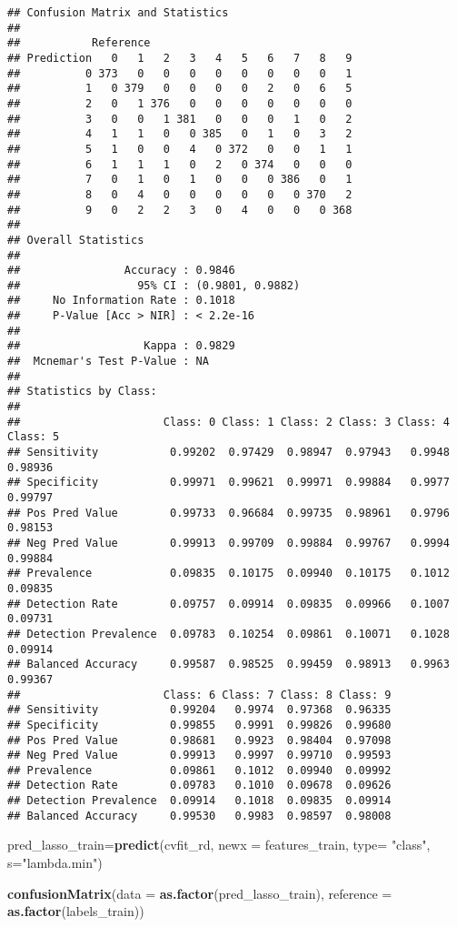 \documentclass[]{article}
\newenvironment{Shaded}{\begin{snugshade}}{\end{snugshade}}
\newcommand{\KeywordTok}[1]{\textcolor[rgb]{0.13,0.29,0.53}{\textbf{#1}}}
\newcommand{\DataTypeTok}[1]{\textcolor[rgb]{0.13,0.29,0.53}{#1}}
\newcommand{\StringTok}[1]{\textcolor[rgb]{0.31,0.60,0.02}{#1}}
\newcommand{\NormalTok}[1]{#1}
\begin{document}
\begin{verbatim}
## Confusion Matrix and Statistics
## 
##           Reference
## Prediction   0   1   2   3   4   5   6   7   8   9
##          0 373   0   0   0   0   0   0   0   0   1
##          1   0 379   0   0   0   0   2   0   6   5
##          2   0   1 376   0   0   0   0   0   0   0
##          3   0   0   1 381   0   0   0   1   0   2
##          4   1   1   0   0 385   0   1   0   3   2
##          5   1   0   0   4   0 372   0   0   1   1
##          6   1   1   1   0   2   0 374   0   0   0
##          7   0   1   0   1   0   0   0 386   0   1
##          8   0   4   0   0   0   0   0   0 370   2
##          9   0   2   2   3   0   4   0   0   0 368
## 
## Overall Statistics
##                                           
##                Accuracy : 0.9846          
##                  95% CI : (0.9801, 0.9882)
##     No Information Rate : 0.1018          
##     P-Value [Acc > NIR] : < 2.2e-16       
##                                           
##                   Kappa : 0.9829          
##  Mcnemar's Test P-Value : NA              
## 
## Statistics by Class:
## 
##                      Class: 0 Class: 1 Class: 2 Class: 3 Class: 4 Class: 5
## Sensitivity           0.99202  0.97429  0.98947  0.97943   0.9948  0.98936
## Specificity           0.99971  0.99621  0.99971  0.99884   0.9977  0.99797
## Pos Pred Value        0.99733  0.96684  0.99735  0.98961   0.9796  0.98153
## Neg Pred Value        0.99913  0.99709  0.99884  0.99767   0.9994  0.99884
## Prevalence            0.09835  0.10175  0.09940  0.10175   0.1012  0.09835
## Detection Rate        0.09757  0.09914  0.09835  0.09966   0.1007  0.09731
## Detection Prevalence  0.09783  0.10254  0.09861  0.10071   0.1028  0.09914
## Balanced Accuracy     0.99587  0.98525  0.99459  0.98913   0.9963  0.99367
##                      Class: 6 Class: 7 Class: 8 Class: 9
## Sensitivity           0.99204   0.9974  0.97368  0.96335
## Specificity           0.99855   0.9991  0.99826  0.99680
## Pos Pred Value        0.98681   0.9923  0.98404  0.97098
## Neg Pred Value        0.99913   0.9997  0.99710  0.99593
## Prevalence            0.09861   0.1012  0.09940  0.09992
## Detection Rate        0.09783   0.1010  0.09678  0.09626
## Detection Prevalence  0.09914   0.1018  0.09835  0.09914
## Balanced Accuracy     0.99530   0.9983  0.98597  0.98008
\end{verbatim}

\begin{Shaded}
\begin{Highlighting}[]
\NormalTok{pred_lasso_train=}\KeywordTok{predict}\NormalTok{(cvfit_rd, }\DataTypeTok{newx =}\NormalTok{ features_train, }\DataTypeTok{type=} \StringTok{"class"}\NormalTok{, }\DataTypeTok{s=}\StringTok{"lambda.min"}\NormalTok{)}

\KeywordTok{confusionMatrix}\NormalTok{(}\DataTypeTok{data =} \KeywordTok{as.factor}\NormalTok{(pred_lasso_train), }\DataTypeTok{reference =} \KeywordTok{as.factor}\NormalTok{(labels_train))}
\end{Highlighting}
\end{Shaded}
\end{document}
